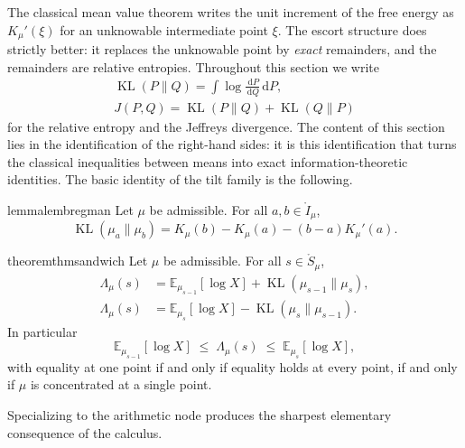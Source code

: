 \documentclass[sn-mathphys-num]{sn-jnl}
\theoremstyle{thmstyleone}%
\theoremstyle{thmstyletwo}%
\theoremstyle{thmstylethree}%
\theoremstyle{thmstyleone}%
\providecommand{\E}{\mathbb{E}}
\providecommand{\KL}{\operatorname{KL}}
\providecommand{\dd}{\,\mathrm{d}}
\begin{document}
	The classical mean value theorem writes the unit increment of the
	free energy as $K_\mu'(\xi)$ for an unknowable intermediate point
	$\xi$. The escort structure does strictly better: it replaces the
	unknowable point by \emph{exact} remainders, and the remainders are
	relative entropies. Throughout this section we write
	\begin{equation}\label{eq:kldef}
		\begin{gathered}
			\KL(P\|Q)=\int\log\frac{\dd P}{\dd Q}\dd P,\\
			J(P,Q)=\KL(P\|Q)+\KL(Q\|P)
		\end{gathered}
	\end{equation}
	for the relative entropy and the Jeffreys divergence. The content of
	this section lies in the identification of the right-hand sides: it
	is this identification that turns the classical inequalities between
	means into exact information-theoretic identities. The basic
	identity of the tilt family is the following.
	
	\begin{restatable}{lemma}{lembregman}\label{lem:bregman}
		Let $\mu$ be admissible. For all $a,b\in\mathring I_\mu$,
		\begin{equation}\label{eq:bregman}
			\KL(\mu_a\|\mu_b)=K_\mu(b)-K_\mu(a)-(b-a)K_\mu'(a).
		\end{equation}
	\end{restatable}
	
	
	\begin{restatable}{theorem}{thmsandwich}\label{thm:sandwich}
		Let $\mu$ be admissible. For all $s\in\mathring S_\mu$,
		\begin{align}
			\Lambda_\mu(s)
			&=\E_{\mu_{s-1}}[\log X]+\KL(\mu_{s-1}\|\mu_s),
			\label{eq:sandwichlower}\\[2pt]
			\Lambda_\mu(s)
			&=\E_{\mu_{s}}[\log X]-\KL(\mu_{s}\|\mu_{s-1}).
			\label{eq:sandwichupper}
		\end{align}
		In particular
		\begin{equation}\label{eq:sandwich}
			\E_{\mu_{s-1}}[\log X]\;\le\;\Lambda_\mu(s)
			\;\le\;\E_{\mu_s}[\log X],
		\end{equation}
		with equality at one point if and only if equality holds at every
		point, if and only if $\mu$ is concentrated at a single point.
	\end{restatable}
	
	
	Specializing to the arithmetic node produces the sharpest elementary
	consequence of the calculus.
	
\end{document}
